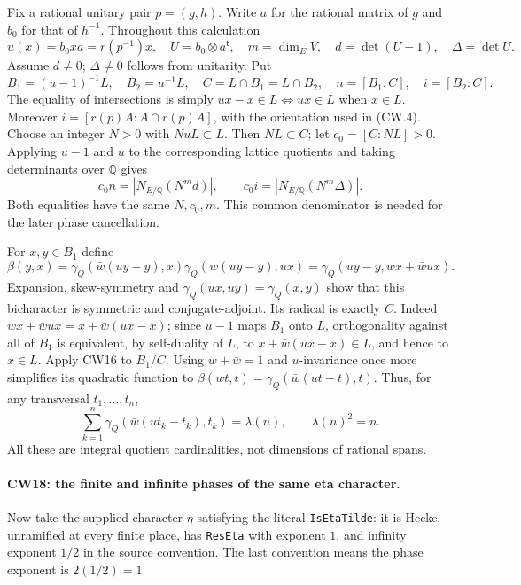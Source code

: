 Fix a rational unitary pair $p=(g,h)$.  Write $a$ for the rational
matrix of $g$ and $b_0$ for that of $h^{-1}$.  Throughout this
calculation
\[
 u(x)=b_0xa=r(p^{-1})x,\quad
 U=b_0\otimes a^{\mathsf t},\quad
 m=\dim_E V,\quad d=\det(U-1),\quad\Delta=\det U.
                                                               \tag{CW.35}
\]
Assume $d\ne0$; $\Delta\ne0$ follows from unitarity.
Put
\[
 B_1=(u-1)^{-1}L,\quad B_2=u^{-1}L,\quad
 C=L\cap B_1=L\cap B_2,\quad n=[B_1:C],\quad i=[B_2:C].
                                                               \tag{CW.36}
\]
The equality of intersections is simply
$ux-x\in L\iff ux\in L$ when $x\in L$.
Moreover $i=[r(p)A:A\cap r(p)A]$, with the orientation used in
(CW.4).  Choose an integer $N>0$ with $NuL\subset L$.
Then $NL\subset C$; let $c_0=[C:NL]>0$.
Applying $u-1$ and $u$ to the corresponding lattice quotients
and taking determinants over $\mathbb Q$ gives
\[
 c_0n=|N_{E/\mathbb Q}(N^m d)|,\qquad
 c_0i=|N_{E/\mathbb Q}(N^m\Delta)|.                   \tag{CW.37}
\]
Both equalities have the same $N,c_0,m$.  This common denominator
is needed for the later phase cancellation.

For $x,y\in B_1$ define
\[
 \beta(y,x)=\gamma_Q(\bar w(uy-y),x)
             \gamma_Q(w(uy-y),ux)
          =\gamma_Q(uy-y,wx+\bar w ux).
\]
Expansion, skew-symmetry and $\gamma_Q(ux,uy)=\gamma_Q(x,y)$
show that this bicharacter is symmetric and conjugate-adjoint.
Its radical is exactly $C$.  Indeed
$wx+\bar w ux=x+\bar w(ux-x)$; since $u-1$ maps $B_1$
onto $L$, orthogonality against all of $B_1$ is equivalent,
by self-duality of $L$, to $x+\bar w(ux-x)\in L$,
and hence to $x\in L$.  Apply CW16 to $B_1/C$.
Using $w+\bar w=1$ and $u$-invariance once more simplifies its
quadratic function to
$\beta(wt,t)=\gamma_Q(\bar w(ut-t),t)$.
Thus, for any transversal $t_1,\ldots,t_n$,
\[
       \sum_{k=1}^n\gamma_Q(\bar w(ut_k-t_k),t_k)
                       =\lambda(n),\qquad\lambda(n)^2=n.
                                                               \tag{CW.38}
\]
All these are integral quotient cardinalities, not dimensions of
rational spans.

\paragraph{CW18: the finite and infinite phases of the same eta character.}
Now take the supplied character $\eta$ satisfying the literal
\texttt{IsEtaTilde}: it is Hecke, unramified at every finite place,
has \texttt{ResEta} with exponent $1$, and infinity exponent
$1/2$ in the source convention.  The last convention means the
phase exponent is $2(1/2)=1$.

